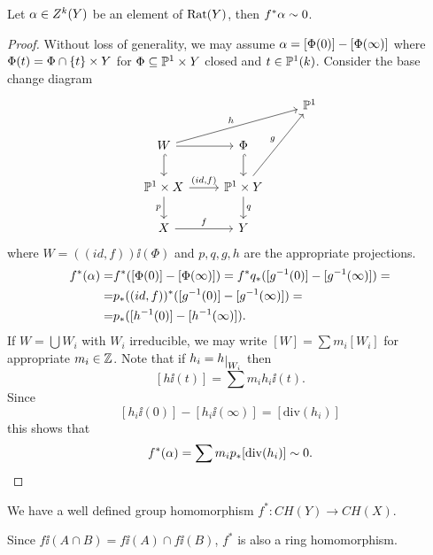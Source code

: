 \begin{proposition}[]
Let $\alpha\in Z^k(Y)$ be an element of $\mathrm{Rat}(Y)$, then $f^\ast\alpha\sim 0$.
\end{proposition}
\begin{proof}
Without loss of generality, we may assume $\alpha=[\Phi(0)]-[\Phi(\infty)]$ where $\Phi(t)=\Phi\cap \left\{{t}\right\}\times Y$ for $\Phi\subseteq \mathbb{P}^1\times Y$ closed and $t\in \mathbb{P}^1(k)$.
Consider the base change diagram
\[\begin{tikzcd}
	&& {\Pj^1} \\
	W & \Phi \\
	{\Pj^1\times X} & {\Pj^1\times Y} \\
	X & Y
	\arrow["h", from=2-1, to=1-3]
	\arrow[from=2-1, to=2-2]
	\arrow[hook, from=2-1, to=3-1]
	\arrow[hook, from=2-2, to=3-2]
	\arrow["{(id,f)}", from=3-1, to=3-2]
	\arrow["p"', from=3-1, to=4-1]
	\arrow["g", from=3-2, to=1-3]
	\arrow["q", from=3-2, to=4-2]
	\arrow["f", from=4-1, to=4-2]
\end{tikzcd}\]
where $W=((id, f))\ii(\Phi)$ and $p,q,g,h$ are the appropriate projections.
\begin{align*}
f^\ast(\alpha)=&f^\ast([\Phi(0)]-[\Phi(\infty)])=f^\ast q_\ast([g^{-1}(0)]-[g^{-1}(\infty)])=\\
=&p_\ast((id, f))^\ast([g^{-1}(0)]-[g^{-1}(\infty)])=\\
=&p_\ast([h^{-1}(0)]-[h^{-1}(\infty)]).
\end{align*}
If $W=\bigcup W_i$ with $W_i$ irreducible, we may write $[W]=\sum m_i[W_i]$ for appropriate $m_i\in\mathbb{Z}$. Note that if $h_i=h\res{W_i}$ then
\[[h\ii(t)]=\sum m_i h_i\ii(t).\]
Since
\[[h_i\ii(0)]-[h_i\ii(\infty)]=[\mathrm{div}(h_i)]\]
this shows that
\[f^\ast(\alpha)=\sum m_i p_\ast[\mathrm{div}(h_i)]\sim 0.\]
\end{proof}


\begin{corollary}[]
We have a well defined group homomorphism $f^\ast:CH(Y)\to CH(X)$.
\end{corollary}

\begin{remark}
Since $f\ii(A\cap B)=f\ii(A)\cap f\ii(B)$, $f^\ast$ is also a ring homomorphism.
\end{remark}


